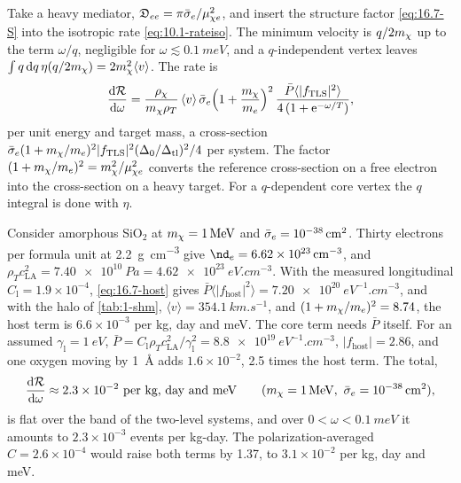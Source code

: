 Take a heavy mediator, $\mathfrak{D}_{ee} = \pi\bar{\sigma}_{e}/\mu_{\chi e}^2$, and insert the structure factor \cref{eq:16.7-S} into the isotropic rate \cref{eq:10.1-rateiso}. The minimum velocity is $q/2m_{\chi}$ up to the term $\omega/q$, negligible for $\omega \lesssim \SI{0.1}{meV}$, and a $q$-independent vertex leaves $\int q\,\mathrm{d} q\,\eta(q/2m_{\chi}) = 2m_{\chi}^2\langle v\rangle$. The rate is
\begin{equation}
  \frac{\mathrm{d}\mathcal{R}}{\mathrm{d}\omega} = \frac{\rho_\chi}{m_{\chi}\rho_T}\,\langle v\rangle\,\bar{\sigma}_{e}\Bigl(1 + \frac{m_{\chi}}{m_e}\Bigr)^2\,\frac{\bar P\langle|f_{\mathrm{TLS}}|^2\rangle}{4\,(1 + \mathrm{e}^{-\omega/T})} ,
  \label{eq:16.7-rate}
\end{equation}
per unit energy and target mass, a cross-section $\bar{\sigma}_{e}(1 + m_{\chi}/m_e)^2|f_{\mathrm{TLS}}|^2(\Delta_0/\Delta_{\mathrm{tl}})^2/4$ per system. The factor $(1 + m_{\chi}/m_e)^2 = m_{\chi}^2/\mu_{\chi e}^2$ converts the reference cross-section on a free electron into the cross-section on a heavy target. For a $q$-dependent core vertex the $q$ integral is done with $\eta$.

Consider amorphous SiO$_2$ at $m_{\chi} = \SI{1}{MeV}$ and $\bar{\sigma}_{e} = \SI{e-38}{cm^2}$. Thirty electrons per formula unit at \SI{2.2}{g.cm^{-3}} give $\nd_e = \SI{6.62e23}{cm^{-3}}$, and $\rho_Tc_{\mathrm{LA}}^2 = \SI{7.40e10}{Pa} = \SI{4.62e23}{eV.cm^{-3}}$. With the measured longitudinal $C_{\mathrm{l}} = 1.9\times10^{-4}$, \cref{eq:16.7-host} gives $\bar P\langle|f_{\mathrm{host}}|^2\rangle = \SI{7.20e20}{eV^{-1}.cm^{-3}}$, and with the halo of \cref{tab:1-shm}, $\langle v\rangle = \SI{354.1}{km.s^{-1}}$, and $(1 + m_{\chi}/m_e)^2 = 8.74$, the host term is $6.6\times10^{-3}$ per kg, day and meV. The core term needs $\bar P$ itself. For an assumed $\gamma_{\mathrm{l}} = \SI{1}{eV}$, $\bar P = C_{\mathrm{l}}\rho_Tc_{\mathrm{LA}}^2/\gamma_{\mathrm{l}}^2 = \SI{8.8e19}{eV^{-1}.cm^{-3}}$, $|f_{\mathrm{host}}| = 2.86$, and one oxygen moving by \SI{1}{\angstrom} adds $1.6\times10^{-2}$, 2.5 times the host term. The total,
\begin{equation*}
  \frac{\mathrm{d}\mathcal{R}}{\mathrm{d}\omega} \approx 2.3\times10^{-2}\ \text{per kg, day and meV} \qquad (m_{\chi} = \SI{1}{MeV},\ \bar{\sigma}_{e} = \SI{e-38}{cm^2}),
\end{equation*}
is flat over the band of the two-level systems, and over $0 < \omega < \SI{0.1}{meV}$ it amounts to $2.3\times10^{-3}$ events per kg-day. The polarization-averaged $C = 2.6\times10^{-4}$ would raise both terms by 1.37, to $3.1\times10^{-2}$ per kg, day and meV.

